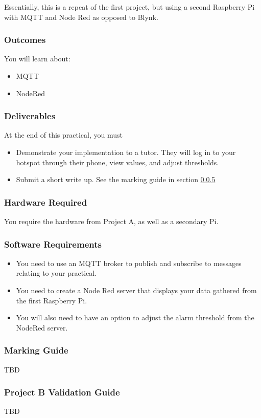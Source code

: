Essentially, this is a repeat of the first project, but using a second Raspberry Pi with MQTT and Node Red as opposed to Blynk.

\subsubsection{Outcomes}
You will learn about:
\begin{itemize}
    \item MQTT
    \item NodeRed
\end{itemize}

\subsubsection{Deliverables}
At the end of this practical, you must
\begin{itemize}
    \item Demonstrate your implementation to a tutor. They will log in to your hotspot through their phone, view values, and adjust thresholds.
    \item Submit a short write up. See the marking guide in section \ref{sec:ProjBMarks}
\end{itemize}

\subsubsection{Hardware Required}
You require the hardware from Project A, as well as a secondary Pi.

\subsubsection{Software Requirements}
\begin{itemize}
    \item You need to use an MQTT broker to publish and subscribe to messages relating to your practical. 
    \item You need to create a Node Red server that displays your data gathered from the first Raspberry Pi. 
    \item You will also need to have an option to adjust the alarm threshold from the NodeRed server.
\end{itemize}

\subsubsection{Marking Guide}
\label{sec:ProjBMarks}
TBD

\subsubsection{Project B Validation Guide}
\label{sec:ProjBValidation}
TBD
